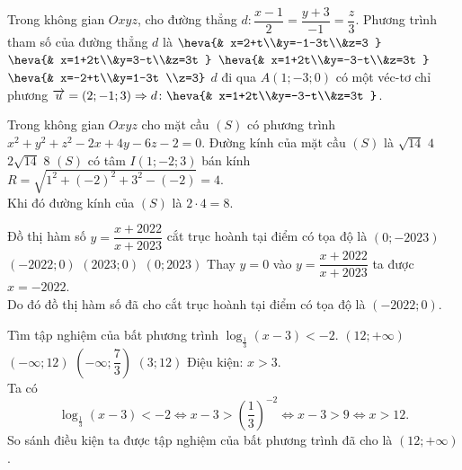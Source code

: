 \begin{ex}%
Trong không gian $Oxyz$, cho đường thẳng $d\colon \dfrac{x-1}{2}=\dfrac{y+3}{-1}=\dfrac{z}{3}$. Phương trình tham số của đường thẳng $d$ là
\choice 
{$\heva{& x=2+t\\&y=-1-3t\\&z=3 }$} 
{$\heva{& x=1+2t\\&y=3-t\\&z=3t }$}
{\True $\heva{& x=1+2t\\&y=-3-t\\&z=3t }$} 
{$\heva{& x=-2+t\\&y=1-3t \\z=3}$}
\loigiai
{
$d$ đi qua $A(1;-3;0)$ có một véc-tơ chỉ phương $\overrightarrow{u}=(2;-1;3)\Rightarrow d\colon\heva{& x=1+2t\\&y=-3-t\\&z=3t }$.
}
\end{ex}

\begin{ex}%
Trong không gian $Oxyz$ cho mặt cầu $(S)$ có phương trình $x^2+y^2+z^2-2x+4y-6z-2=0$. Đường kính của mặt cầu $(S)$ là
\choice 
{$\sqrt{14}$} 
{$4$}
{$2\sqrt{14}$} 
{\True $8$}
\loigiai
{
$(S)$ có tâm $I(1;-2;3)$ bán kính $R=\sqrt{1^2+(-2)^2+3^2-(-2)}=4$.\\
Khi đó đường kính của $(S)$ là $2\cdot 4=8$.
}
\end{ex}

\begin{ex}%
Đồ thị hàm số $y=\dfrac{x+2022}{x+2023}$ cắt trục hoành tại điểm có tọa độ là
\choice 
{$(0;-2023)$} 
{\True $(-2022;0)$}
{$(2023;0)$} 
{$(0;2023)$}
\loigiai
{
Thay $y=0$ vào $y=\dfrac{x+2022}{x+2023}$ ta được $x=-2022$.\\
Do đó đồ thị hàm số đã cho cắt trục hoành tại điểm có tọa độ là $(-2022;0)$.
}
\end{ex}

\begin{ex}%
Tìm tập nghiệm của bất phương trình $\log_{\tfrac{1}{3}}(x-3)<-2$.
\choice 
{\True $(12;+\infty )$} 
{$(-\infty ;12)$}
{$\left (-\infty ;\dfrac{7}{3} \right )$} 
{$(3;12)$}
\loigiai
{
Điệu kiện: $x>3$.\\
Ta có
$$\log_{\tfrac{1}{3}}(x-3)<-2\Leftrightarrow x-3>\left (\dfrac{1}{3} \right )^{-2}\Leftrightarrow x-3>9\Leftrightarrow x>12.$$
So sánh điều kiện ta được tập nghiệm của bất phương trình đã cho là $(12;+\infty )$.
}
\end{ex}

